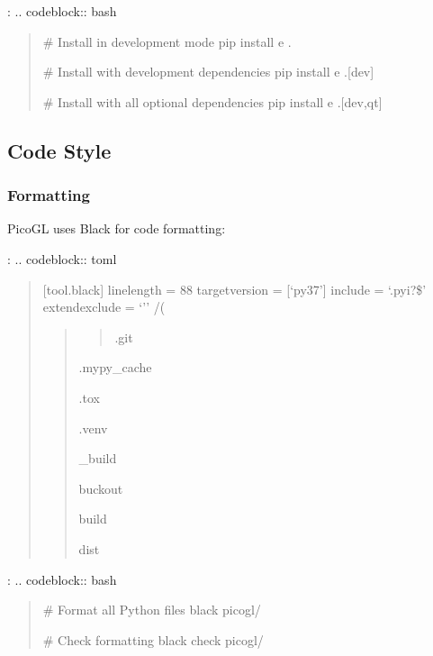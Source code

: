 \documentclass[a4paper,10pt,english,openany,oneside]{sphinxmanual}
\begin{document}
\sphinxAtStartPar
{}:
.. code\sphinxhyphen{}block:: bash
\begin{quote}

\sphinxAtStartPar
\# Install in development mode
pip install \sphinxhyphen{}e .

\sphinxAtStartPar
\# Install with development dependencies
pip install \sphinxhyphen{}e .{[}dev{]}

\sphinxAtStartPar
\# Install with all optional dependencies
pip install \sphinxhyphen{}e .{[}dev,qt{]}
\end{quote}


\subsection{Code Style}
\label{\detokenize{development:code-style}}

\subsubsection{Formatting}
\label{\detokenize{development:formatting}}
\sphinxAtStartPar
PicoGL uses Black for code formatting:

\sphinxAtStartPar
{}:
.. code\sphinxhyphen{}block:: toml
\begin{quote}

\sphinxAtStartPar
{[}tool.black{]}
line\sphinxhyphen{}length = 88
target\sphinxhyphen{}version = {[}‘py37’{]}
include = ‘.pyi?\$’
extend\sphinxhyphen{}exclude = ‘’’
/(
\begin{quote}
\begin{quote}

\sphinxAtStartPar
.git
\end{quote}

\begin{DUlineblock}{0em}
\item[] .mypy\_cache
\item[] .tox
\item[] .venv
\item[] \_build
\item[] buck\sphinxhyphen{}out
\item[] build
\item[] dist
\end{DUlineblock}
\end{quote}
\end{quote}

\sphinxAtStartPar
{}:
.. code\sphinxhyphen{}block:: bash
\begin{quote}

\sphinxAtStartPar
\# Format all Python files
black picogl/

\sphinxAtStartPar
\# Check formatting
black \textendash{}check picogl/
\end{quote}
\end{document}
